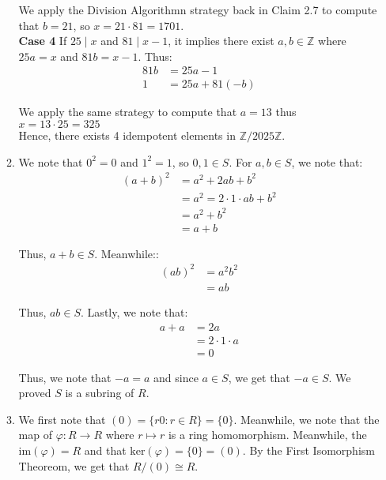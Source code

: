 \documentclass{article}
\begin{document}
\begin{enumerate}
\begin{enumerate}
    We apply the Division Algorithmn strategy back in Claim 2.7 to compute that $b = 21$, so $x = 21 \cdot 81 = 1701$. \\ 

    \textbf{Case 4} If $25 \mid x$ and $81 \mid x-1$, it implies there exist $a, b \in \mathbb{Z}$ where $25a = x$ and $81b = x - 1$. Thus: 
    \begin{align*}
        81b &= 25a - 1 \\
        1 &= 25a + 81(-b)
    \end{align*}

    We apply the same strategy to compute that $a = 13$ thus $x = 13 \cdot 25 = 325$ \\ 

    Hence, there exists 4 idempotent elements in $\mathbb{Z} / 2025 \mathbb{Z}$. \\

    \item 
    We note that $0^2 = 0$ and $1^2 = 1$, so $0, 1 \in S$. For $a,b \in S$, we note that: 
    \begin{align*}
        (a + b)^2 &= a^2 + 2ab + b^2 \\
        &= a^2 = 2 \cdot 1 \cdot ab + b^2 \\
        &= a^2 + b^2 \\
        &= a + b 
    \end{align*}

    Thus, $a + b \in S$. Meanwhile:: 
    \begin{align*}
        (ab)^2 &= a^2 b^2 \\
        &= ab
    \end{align*}

    Thus, $ab \in S$. Lastly, we note that: 
    \begin{align*}
        a + a &= 2a \\
        &= 2 \cdot 1 \cdot a \\
        &= 0
    \end{align*}

    Thus, we note that $-a = a$ and since $a \in S$, we get that $-a \in S$. We proved $S$ is a subring of $R$. \\

    \item 
    We first note that $(0) = \{r0 : r \in R\} = \{0\}$. Meanwhile, we note that the map of $\varphi: R \rightarrow R$ where $r \mapsto r$ is a ring homomorphism. Meanwhile, the $\text{im}(\varphi) = R$ and that $\text{ker}(\varphi) = \{0\} = (0)$. By the First Isomorphism Theoreom, we get that $R/(0) \cong R$. \\


\end{enumerate}
\end{enumerate}
\end{document}
